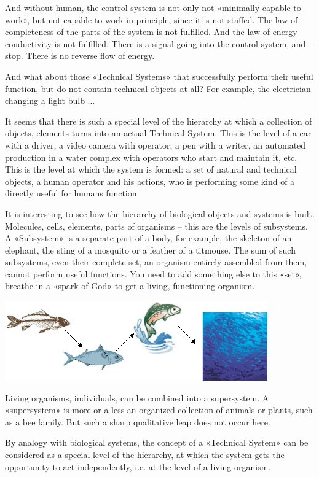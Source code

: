 \documentclass[11pt,a4paper]{article}
\begin{document}
And without human, the control system is not only not «minimally capable to
work», but not capable to work in principle, since it is not staffed. The law
of completeness of the parts of the system is not fulfilled. And the law of
energy conductivity is not fulfilled. There is a signal going into the control
system, and -- stop. There is no reverse flow of energy.

And what about those «Technical Systems» that successfully perform their
useful function, but do not contain technical objects at all? For example,
the electrician changing a light bulb ...

It seems that there is such a special level of the hierarchy at which a
collection of objects, elements turns into an actual Technical System. This is
the level of a car with a driver, a video camera with operator, a pen with a
writer, an automated production in a water complex with operators who start
and maintain it, etc.  This is the level at which the system is formed: a set
of natural and technical objects, a human operator and his actions, who is
performing some kind of a directly useful for humans function.

It is interesting to see how the hierarchy of biological objects and systems
is built. Molecules, cells, elements, parts of organisms -- this are the
levels of subsystems.  A «Subsystem» is a separate part of a body, for
example, the skeleton of an elephant, the sting of a mosquito or a feather of
a titmouse.  The sum of such subsystems, even their complete set, an organism
entirely assembled from them, cannot perform useful functions. You need to add
something else to this «set», breathe in a «spark of God» to get a living,
functioning organism.
\begin{center}
 \includegraphics[width=.6\textwidth]{mts-2.png}
\end{center}
Living organisms, individuals, can be combined into a supersystem.  A
«supersystem» is more or a less an organized collection of animals or plants,
such as a bee family.  But such a sharp qualitative leap does not occur here.

By analogy with biological systems, the concept of a «Technical System» can be
considered as a special level of the hierarchy, at which the system gets the
opportunity to act independently, i.e. at the level of a living organism.
\end{document}
